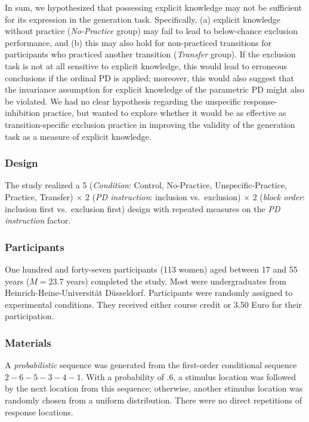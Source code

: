 \documentclass[man]{apa6}
\theoremstyle{definition}
\theoremstyle{definition}
\theoremstyle{definition}
\theoremstyle{remark}
\begin{document}
In sum, we hypothesized that possessing explicit knowledge may not be
sufficient for its expression in the generation task. Specifically, (a)
explicit knowledge without practice (\emph{No-Practice} group) may fail
to lead to below-chance exclusion performance, and (b) this may also
hold for non-practiced transitions for participants who practiced
another transition (\emph{Transfer} group). If the exclusion task is not
at all sensitive to explicit knowledge, this would lead to erroneous
conclusions if the ordinal PD is applied; moreover, this would also
suggest that the invariance assumption for explicit knowledge of the
parametric PD might also be violated. We had no clear hypothesis
regarding the unspecific response-inhibition practice, but wanted to
explore whether it would be as effective as transition-specific
exclusion practice in improving the validity of the generation task as a
measure of explicit knowledge.

\subsubsection{Design}\label{design}

The study realized a 5 (\emph{Condition}: Control, No-Practice,
Unspecific-Practice, Practice, Transfer) \(\times\) 2 (\emph{PD
instruction}: inclusion vs.~exclusion) \(\times\) 2 (\emph{block order}:
inclusion first vs.~exclusion first) design with repeated measures on
the \emph{PD instruction} factor.

\subsubsection{Participants}\label{participants}

One hundred and forty-seven participants (113 women) aged between 17 and
55 years (\(M = 23.7\) years) completed the study. Most were
undergraduates from Heinrich-Heine-Universität Düsseldorf. Participants
were randomly assigned to experimental conditions. They received either
course credit or 3.50 Euro for their participation.

\subsubsection{Materials}\label{materials}

A \emph{probabilistic} sequence was generated from the first-order
conditional sequence \(2-6-5-3-4-1\). With a probability of \(.6\), a
stimulus location was followed by the next location from this sequence;
otherwise, another stimulus location was randomly chosen from a uniform
distribution. There were no direct repetitions of response locations.
\end{document}
